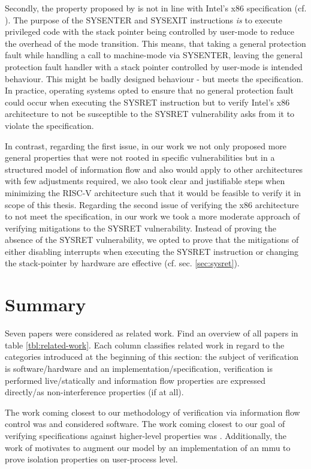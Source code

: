 Secondly, the property proposed by \citeauthor{BradfieldS16} is not in line with Intel's x86 specification (cf. \cite{Dunlap19}).
The purpose of the SYSENTER and SYSEXIT instructions \textit{is} to execute privileged code with the stack pointer being controlled by user-mode to reduce the overhead of the mode transition.
This means, that taking a general protection fault while handling a call to machine-mode via SYSENTER, leaving the general protection fault handler with a stack pointer controlled by user-mode is intended behaviour.
This might be badly designed behaviour - but meets the specification.
In practice, operating systems opted to ensure that no general protection fault could occur when executing the SYSRET instruction but to verify Intel's x86 architecture to not be susceptible to the SYSRET vulnerability asks from it to violate the specification.

In contrast, regarding the first issue, in our work we not only proposed more general properties that were not rooted in specific vulnerabilities but in a structured model of information flow and also would apply to other architectures with few adjustments required, we also took clear and justifiable steps when minimizing the RISC-V architecture such that it would be feasible to verify it in scope of this thesis.
Regarding the second issue of verifying the x86 architecture to not meet the specification, in our work we took a more moderate approach of verifying mitigations to the SYSRET vulnerability.
Instead of proving the absence of the SYSRET vulnerability, we opted to prove that the mitigations of either disabling interrupts when executing the SYSRET instruction or changing the stack-pointer by hardware are effective (cf. sec. \ref{sec:sysret}).

\section{Summary}

Seven papers were considered as related work.
Find an overview of all papers in table \ref{tbl:related-work}.
Each column classifies related work in regard to the categories introduced at the beginning of this section: the subject of verification is software/hardware and an implementation/specification, verification is performed live/statically and information flow properties are expressed directly/as non-interference properties (if at all).

The work coming closest to our methodology of verification via information flow control was \cite{GordonKPGNR15,SuhLZD04} and considered software.
The work coming closest to our goal of verifying specifications against higher-level properties was \cite{Fox02,KhakpourSD13,BradfieldS16}.
Additionally, the work of \cite{SuhLZD04,KhakpourSD13} motivates to augment our model by an implementation of an \gls{mmu} to prove isolation properties on user-process level.

